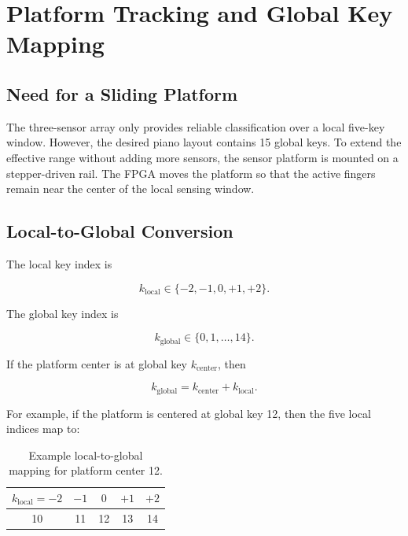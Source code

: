 \section{Platform Tracking and Global Key Mapping}
\label{sec:platform_tracking}

\subsection{Need for a Sliding Platform}

The three-sensor array only provides reliable classification over a local five-key window. However, the desired piano layout contains 15 global keys. To extend the effective range without adding more sensors, the sensor platform is mounted on a stepper-driven rail. The FPGA moves the platform so that the active fingers remain near the center of the local sensing window.

\subsection{Local-to-Global Conversion}

The local key index is

\begin{equation}
    k_{\mathrm{local}} \in \{-2,-1,0,+1,+2\}.
\end{equation}

The global key index is

\begin{equation}
    k_{\mathrm{global}} \in \{0,1,\ldots,14\}.
\end{equation}

If the platform center is at global key $k_{\mathrm{center}}$, then

\begin{equation}
    k_{\mathrm{global}} = k_{\mathrm{center}} + k_{\mathrm{local}}.
\end{equation}

For example, if the platform is centered at global key 12, then the five local indices map to:

\begin{table}[H]
    \centering
    \caption{Example local-to-global mapping for platform center 12.}
    \label{tab:local_global_example}
    \renewcommand{\arraystretch}{1.2}
    \begin{tabular}{c c c c c}
        \toprule
        $k_{\mathrm{local}}=-2$ & $-1$ & $0$ & $+1$ & $+2$ \\
        \midrule
        10 & 11 & 12 & 13 & 14 \\
        \bottomrule
    \end{tabular}
\end{table}


